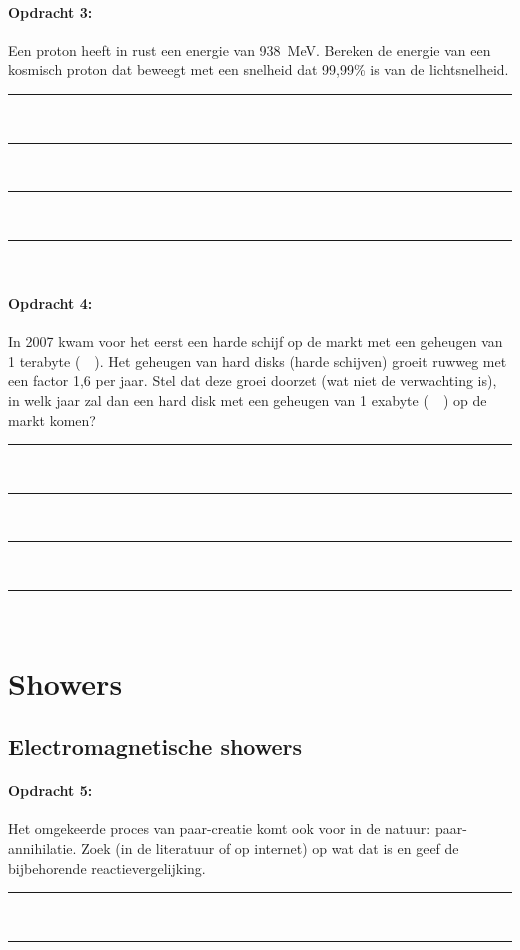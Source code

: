 \begin{minipage}[t]{1\columnwidth}
\paragraph{Opdracht 3:}
Een proton heeft in rust een energie van \SI{938}{\mega\electronvolt}.
Bereken de energie van een kosmisch proton dat beweegt met een snelheid
dat 99,99\% is van de lichtsnelheid.
\begin{center}
    \rule{\textwidth}{0.3mm}\\
    \rule{\textwidth}{0.3mm}\\
    \rule{\textwidth}{0.3mm}\\
    \rule{\textwidth}{0.3mm}\\
\end{center}
\end{minipage}
\bigskip{}

\begin{minipage}[t]{1\columnwidth}
\paragraph{Opdracht 4:}
In 2007 kwam voor het eerst een harde schijf op de markt met een
geheugen van 1 terabyte (\SI{}{\tera\byte}). Het geheugen van hard disks
(harde schijven) groeit ruwweg met een factor 1,6 per jaar. Stel dat
deze groei doorzet (wat niet de verwachting is), in welk jaar zal dan
een hard disk met een geheugen van 1 exabyte (\SI{}{\exa\byte}) op de
markt komen? 
\begin{center}
    \rule{\textwidth}{0.3mm}\\
    \rule{\textwidth}{0.3mm}\\
    \rule{\textwidth}{0.3mm}\\
    \rule{\textwidth}{0.3mm}\\
\end{center}
\end{minipage}


\section{Showers}

\subsection{Electromagnetische showers}

\begin{minipage}[t]{1\columnwidth}
\paragraph{Opdracht 5:}
Het omgekeerde proces van paar-creatie komt ook voor in de natuur:
paar-annihilatie. Zoek (in de literatuur of op internet) op wat dat is
en geef de bijbehorende reactievergelijking. 
\begin{center}
    \rule{\textwidth}{0.3mm}\\
    \rule{\textwidth}{0.3mm}\\
\end{center}
\end{minipage}


